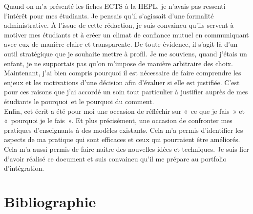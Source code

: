 Quand on m'a présenté les fiches ECTS à la HEPL, je n'avais pas ressenti l'intérêt pour mes étudiants. Je pensais qu'il s'agissait d'une formalité administrative. À l'issue de cette rédaction, je suis convaincu qu'ils servent à motiver mes étudiants et à créer un climat de confiance mutuel en communiquant avec eux de manière claire et transparente. De toute évidence, il s'agit là d'un outil stratégique que je souhaite mettre à profil. Je me souviens, quand j'étais un enfant, je ne supportais pas qu'on m'impose de manière arbitraire des choix. Maintenant, j'ai bien compris pourquoi il est nécessaire de faire comprendre les enjeux et les motivations d'une décision afin d’évaluer si elle est justifiée. C'est pour ces raisons que j'ai accordé un soin tout particulier à justifier auprès de mes étudiants le pourquoi~et le pourquoi du comment. \\
Enfin, cet écrit a été pour moi une occasion de réfléchir sur «~ce que je fais~» et «~pourquoi je le fais~». Et plus précisément, une occasion de confronter mes pratiques d'enseignants à des modèles existants. Cela m'a permis d’identifier les aspects de ma pratique qui sont efficaces et ceux qui pourraient être améliorés. Cela m'a aussi permis de faire naitre des nouvelles idées et techniques. Je suis fier d'avoir réalisé ce document et suis convaincu qu'il me prépare au portfolio d'intégration.

\clearpage
\section{Bibliographie}
\printbibliography[heading=none]

%
%






